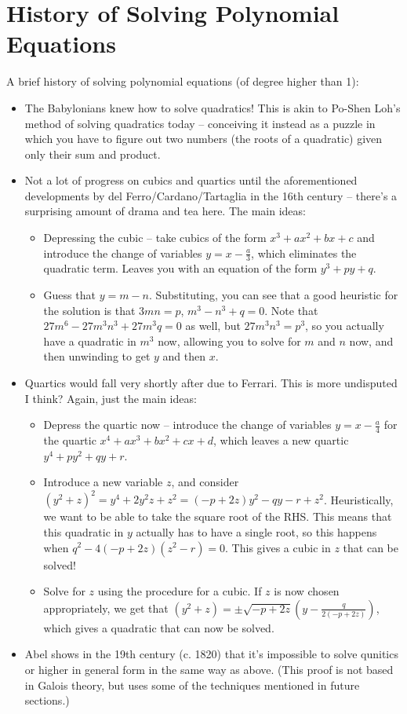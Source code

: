 \documentclass[12pt]{scrartcl}
\begin{document}
\section{History of Solving Polynomial Equations}
A brief history of solving polynomial equations (of degree higher than 1):
\begin{itemize}
	\item The Babylonians knew how to solve quadratics! This is akin to Po-Shen Loh's method of solving quadratics today -- conceiving it instead as a puzzle in which you have to figure out two numbers (the roots of a quadratic) given only their sum and product.
	\item Not a lot of progress on cubics and quartics until the aforementioned developments by del Ferro/Cardano/Tartaglia in the 16th century -- there's a surprising amount of drama and tea here. The main ideas:
	      \begin{itemize}
		      \item Depressing the cubic -- take cubics of the form $x^3 + ax^2 + bx + c$ and introduce the change of variables $y = x - \frac a 3$, which eliminates the quadratic term. Leaves you with an equation of the form $y^3 + py + q$.
		      \item Guess that $y = m - n$. Substituting, you can see that a good heuristic for the solution is that $3mn = p$, $m^3 - n^3 + q = 0$. Note that $27m^6 - 27 m^3 n^3 + 27 m^3 q = 0$ as well, but $27 m^3 n^3 = p^3$, so you actually have a quadratic in $m^3$ now, allowing you to solve for $m$ and $n$ now, and then unwinding to get $y$ and then $x$.
	      \end{itemize}
	\item Quartics would fall very shortly after due to Ferrari. This is more undisputed I think? Again, just the main ideas:
	      \begin{itemize}
		      \item Depress the quartic now -- introduce the change of variables $y = x - \frac a 4$ for the quartic $x^4 + ax^3 + bx^2 + cx + d$, which leaves a new quartic $y^4 + py^2 + qy + r$.
		      \item Introduce a new variable $z$, and consider $(y^2 + z)^2 = y^4 + 2 y^2z + z^2 = (-p + 2z)y^2 - qy - r + z^2$. Heuristically, we want to be able to take the square root of the RHS. This means that this quadratic in $y$ actually has to have a single root, so this happens when $q^2 - 4(-p + 2z)(z^2 - r) = 0$. This gives a cubic in $z$ that can be solved!
		      \item Solve for $z$ using the procedure for a cubic. If $z$ is now chosen appropriately, we get that $(y^2 + z) = \pm \sqrt{-p + 2z} \left(y - \frac q{2(-p + 2z)} \right)$, which gives a quadratic that can now be solved.
	      \end{itemize}
	\item Abel shows in the 19th century (c. 1820) that it's impossible to solve qunitics or higher in general form in the same way as above. (This proof is not based in Galois theory, but uses some of the techniques mentioned in future sections.)


\end{itemize}
\end{document}
